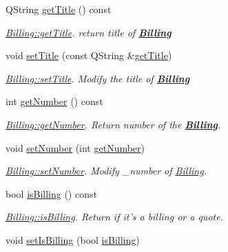 \begin{DoxyCompactItemize}
\item 
Q\+String \hyperlink{classBilling_ad817d4a1dfa011d20b4358a896662f0e}{get\+Title} () const 
\begin{DoxyCompactList}\small\item\em \hyperlink{classBilling_ad817d4a1dfa011d20b4358a896662f0e}{Billing\+::get\+Title}. return title of {\bfseries \hyperlink{classBilling}{Billing}} \end{DoxyCompactList}\item 
void \hyperlink{classBilling_a3e5e98325bd0e9fb4c253ddf07bf66c8}{set\+Title} (const Q\+String \&\hyperlink{classBilling_ad817d4a1dfa011d20b4358a896662f0e}{get\+Title})
\begin{DoxyCompactList}\small\item\em \hyperlink{classBilling_a3e5e98325bd0e9fb4c253ddf07bf66c8}{Billing\+::set\+Title}. Modify the title of {\bfseries \hyperlink{classBilling}{Billing}} \end{DoxyCompactList}\item 
int \hyperlink{classBilling_a23a9446aef6af58bcfa698b76cc24731}{get\+Number} () const 
\begin{DoxyCompactList}\small\item\em \hyperlink{classBilling_a23a9446aef6af58bcfa698b76cc24731}{Billing\+::get\+Number}. Return number of the {\bfseries \hyperlink{classBilling}{Billing}}. \end{DoxyCompactList}\item 
void \hyperlink{classBilling_a1178eab66407b0761c35a13d8da84cdb}{set\+Number} (int \hyperlink{classBilling_a23a9446aef6af58bcfa698b76cc24731}{get\+Number})
\begin{DoxyCompactList}\small\item\em \hyperlink{classBilling_a1178eab66407b0761c35a13d8da84cdb}{Billing\+::set\+Number}. Modify {\itshape \+\_\+number} of \hyperlink{classBilling}{Billing}. \end{DoxyCompactList}\item 
bool \hyperlink{classBilling_ad616bbb5664e0ba2bac6982f06a7c723}{is\+Billing} () const 
\begin{DoxyCompactList}\small\item\em \hyperlink{classBilling_ad616bbb5664e0ba2bac6982f06a7c723}{Billing\+::is\+Billing}. Return if it's a billing or a quote. \end{DoxyCompactList}\item 
void \hyperlink{classBilling_a81a3b85e0e051239521b4e3d93f297c2}{set\+Is\+Billing} (bool \hyperlink{classBilling_ad616bbb5664e0ba2bac6982f06a7c723}{is\+Billing})

\end{DoxyCompactItemize}
